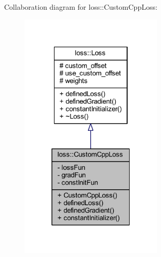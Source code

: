 Collaboration diagram for loss\+:\+:Custom\+Cpp\+Loss\+:
\nopagebreak
\begin{figure}[H]
\begin{center}
\leavevmode
\includegraphics[width=193pt]{classloss_1_1_custom_cpp_loss__coll__graph}
\end{center}
\end{figure}
